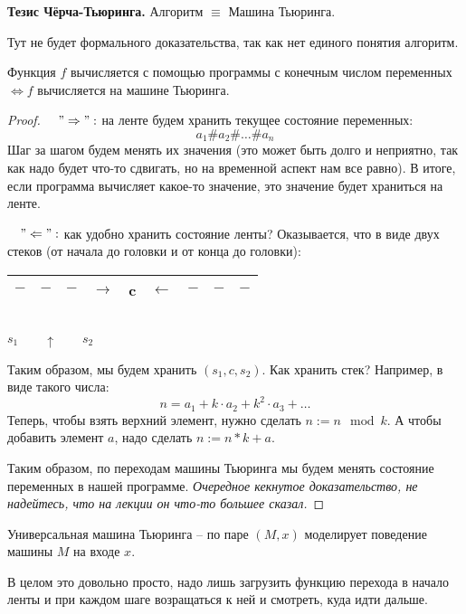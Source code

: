 \textbf{Тезис Чёрча-Тьюринга.} Алгоритм $\equiv$ Машина Тьюринга.

Тут не будет формального доказательства, так как нет единого понятия алгоритм.

\begin{theorem}
    Функция $f$ вычисляется с помощью программы с конечным числом переменных $\Longleftrightarrow f$ вычисляется на машине Тьюринга. 
\end{theorem}
\begin{proof} \quad

    $\quad "\Rightarrow":$ на ленте будем хранить текущее состояние переменных: \[ a_1 \# a_2 \# \dots \# a_n\]
    \quad Шаг за шагом будем менять их значения (это может быть долго и неприятно, так как надо будет что-то сдвигать, но на временной аспект нам все равно). В итоге, если программа вычисляет какое-то значение, это значение будет храниться на ленте.
    
    $\quad "\Leftarrow":$ как удобно хранить состояние ленты? Оказывается, что в виде двух стеков (от начала до головки и от конца до головки): 
    \begin{center}
        \begin{tabular}{|c|c|c|c|c|c|c|c|c|}
            \hline
            $-$ & $-$ & $-$ & $\rightarrow$ & c & $\leftarrow$ & $-$ & $-$ & $-$ \\
            \hline
        \end{tabular}\\
        $s_1 \quad\quad \uparrow \quad\quad s_2$ 
    \end{center}
    \quad Таким образом, мы будем хранить $(s_1, c, s_2)$. Как хранить стек? Например, в виде такого числа: \[ n = a_1 + k \cdot a_2 + k^2 \cdot a_3 + \dots \]
    \quad Теперь, чтобы взять верхний элемент, нужно сделать $n := n \mod k$. А чтобы добавить элемент $a$, надо сделать $n := n * k + a$.

    \quad Таким образом, по переходам машины Тьюринга мы будем менять состояние переменных в нашей программе. \textit{Очередное кекнутое доказательство, не надейтесь, что на лекции он что-то большее сказал.}
\end{proof}

\begin{conj}
    Универсальная машина Тьюринга -- по паре $(M, x)$ моделирует поведение машины $M$ на входе $x$.
\end{conj}
В целом это довольно просто, надо лишь загрузить функцию перехода в начало ленты и при каждом шаге возращаться к ней и смотреть, куда идти дальше.

